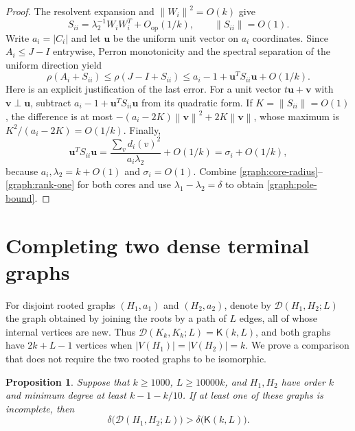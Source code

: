 \documentclass[11pt,a4paper]{article}
\numberwithin{equation}{section}
\newtheorem{proposition}[theorem]{Proposition}
\theoremstyle{definition}
\theoremstyle{remark}
\newcommand{\norm}[1]{\left\lVert#1\right\rVert}
\newcommand{\Kite}{\mathsf{K}}
\begin{document}
\begin{proof}
The resolvent expansion and $\norm{W_i}^2=O(k)$ give
\[
 S_{ii}=\lambda_2^{-1}W_iW_i^T+O_{\mathrm{op}}(1/k),\qquad
 \norm{S_{ii}}=O(1).
\]
Write $a_i=|C_i|$ and let $\mathbf u$ be the uniform unit vector on
$a_i$ coordinates. Since $A_i\le J-I$ entrywise, Perron monotonicity
and the spectral separation of the uniform direction yield
\begin{equation}\label{graph:rank-one}
 \rho(A_i+S_{ii})
 \le\rho(J-I+S_{ii})
 \le a_i-1+\mathbf u^TS_{ii}\mathbf u+O(1/k).
\end{equation}
Here is an explicit justification of the last error. For a unit vector
$t\mathbf u+\mathbf v$ with $\mathbf v\perp\mathbf u$, subtract
$a_i-1+\mathbf u^TS_{ii}\mathbf u$ from its quadratic form. If
$K=\norm{S_{ii}}=O(1)$, the difference is at most
$-(a_i-2K)\norm{\mathbf v}^2+2K\norm{\mathbf v}$, whose maximum is
$K^2/(a_i-2K)=O(1/k)$.
Finally,
\[
 \mathbf u^TS_{ii}\mathbf u
 =\frac{\sum_v d_i(v)^2}{a_i\lambda_2}+O(1/k)
 =\sigma_i+O(1/k),
\]
because $a_i,\lambda_2=k+O(1)$ and $\sigma_i=O(1)$.
Combine \eqref{graph:core-radius}--\eqref{graph:rank-one} for both
cores and use $\lambda_1-\lambda_2=\delta$ to obtain
\eqref{graph:pole-bound}.
\end{proof}


\section{Completing two dense terminal graphs}
\label{dense:section}

For disjoint rooted graphs $(H_1,a_1)$ and $(H_2,a_2)$, denote by
$\mathcal D(H_1,H_2;L)$ the graph obtained by joining the roots by a
path of $L$ edges, all of whose internal vertices are new.  Thus
$\mathcal D(K_k,K_k;L)=\Kite(k,L)$, and both graphs have
$2k+L-1$ vertices when $|V(H_1)|=|V(H_2)|=k$.
We prove a comparison that does not require the two rooted graphs to
be isomorphic.

\begin{proposition}\label{dense:completion}
Suppose that $k\ge1000$, $L\ge10000k$, and $H_1,H_2$ have order $k$
and minimum degree at least $k-1-k/10$.  If at least one of these
graphs is incomplete, then
\[
 \delta\bigl(\mathcal D(H_1,H_2;L)\bigr)
 >\delta\bigl(\Kite(k,L)\bigr).
\]
\end{proposition}
\end{document}
